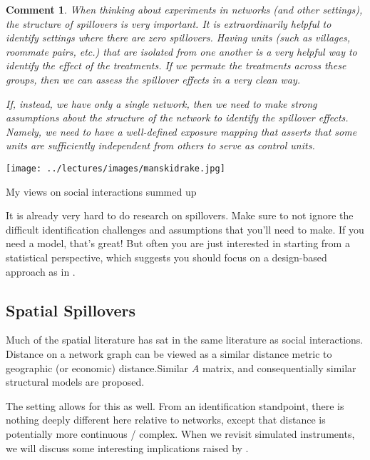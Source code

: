 \documentclass{tufte-handout}
\theoremstyle{break}
\newtheorem{cmt}{Comment}
\begin{document}
\begin{boxF}
  \begin{cmt}
    When thinking about experiments in networks (and other settings), the structure of spillovers is very important. It is extraordinarily helpful to identify settings where there are \emph{zero} spillovers. Having units (such as villages, roommate pairs, etc.) that are isolated from one another is a very helpful way to identify the effect of the treatments. If we permute the treatments across these groups, then we can assess the spillover effects in a very clean way.
    
    \hspace{10pt}If, instead, we have only a single network, then we need to make strong assumptions about the structure of the network to identify the spillover effects. Namely, we need to have a well-defined exposure mapping that asserts that some units are sufficiently independent from others to serve as control units. 
  \end{cmt}
\end{boxF}

\begin{marginfigure}
  \texttt{[image: ../lectures/images/manskidrake.jpg]}
  \caption{
    My views on social interactions summed up}
\end{marginfigure}

It is already very hard to do research on spillovers. Make sure to not ignore the difficult identification challenges and assumptions that you'll need to make.  If you need a model, that's great! But often you are just interested in starting from a statistical perspective, which suggests you should focus on a design-based approach as in \citet{aronow2017estimating}.
 
\subsection{Spatial Spillovers}
Much of the spatial literature has sat in the same literature as social interactions. Distance on a network graph can be viewed as a similar distance metric to geographic (or economic) distance.Similar $A$ matrix, and consequentially similar structural models are proposed. 

The \citet{aronow2017estimating} setting allows for this as well.  From an identification standpoint, there is nothing deeply different here relative to networks, except that distance is potentially more continuous / complex. When we revisit simulated instruments, we will discuss some interesting implications raised by \citet{borusyak2020non}.
\end{document}

